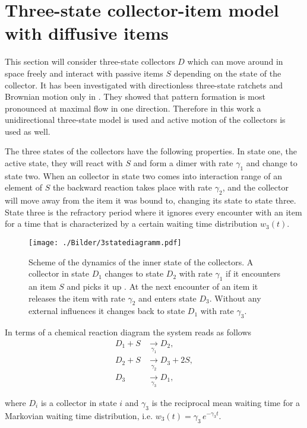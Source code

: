 \section{Three-state collector-item model with diffusive items} \label{sec:sheepndog}

This section will consider three-state collectors $D$ which can move around in space freely and interact with passive items $S$ depending on the state of the collector. It has been investigated with directionless three-state ratchets and Brownian motion only in \cite{SeefeldSchim00}. They showed that pattern formation is most pronounced at maximal flow in one direction. Therefore in this work a unidirectional three-state model is used and active motion of the collectors is used as well.

The three states of the collectors have the following properties. In state one, the active state, they will react with $S$ and form a dimer with rate $\gamma_1$ and change to state two. When an collector in state two comes into interaction range of an element of $S$ the backward reaction takes place with rate $\gamma_2$, and the collector will move away from the item it was bound to, changing its state to state three. State three is the refractory period where it ignores every encounter with an item for a time that is characterized by a certain waiting time distribution $w_3(t)$.

\begin{figure}[H]
\centering
  \texttt{[image: ./Bilder/3statediagramm.pdf]}
\caption{Scheme of the dynamics of the inner state of the collectors. A collector in state $D_1$
changes to state $D_2$ with rate $\gamma_1$ if it encounters an item $S$ and picks it up . At the next encounter of an item it releases the item with rate $\gamma_2$ and enters state $D_3$. Without any external influences it changes back to state $D_1$ with rate $\gamma_3$.}
\end{figure}

In terms of a chemical reaction diagram the system reads as follows
\begin{align}
 \nonumber D_1+S &\underset{\gamma_1}{\rightarrow} D_2,\\
 \nonumber D_2+S &\underset{\gamma_2}{\rightarrow} D_3+2 S,\\
 \label{eq:3ds_chemeq} D_3 &\underset{\gamma_3}{\rightarrow} D_1,
\end{align}

where $D_i$ is a collector in state $i$ and $\gamma_3$ is the reciprocal mean waiting time for a Markovian waiting time distribution, i.e. $w_3(t)=\gamma_3\,e^{-\gamma_3 t}$.

